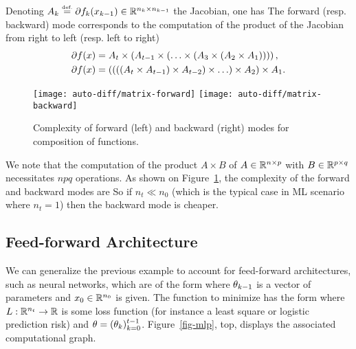 Denoting $A_k \stackrel{\mbox{\upshape\tiny def.}}{=} \partial f_k(x_{k-1}) \in \mathbb{R}^{n_{k} \times n_{k-1}}$ the Jacobian, one has
The forward (resp. backward) mode corresponds to the computation of the product of the Jacobian from right to left (resp. left to right) 
\begin{align*}
	\partial f(x) &= A_{t} \times \left(   A_{t-1} \times \left(  \ldots \times \left(  A_3 \times \left(  A_2 \times A_1  \right)  \right)  \right)  \right), \\
	\partial f(x) &= \left(  \left(  \left(  \left(  A_{t} \times A_{t-1}  \right)  \times A_{t-2}  \right) \times \ldots  \right) \times A_2  \right) \times A_1.
\end{align*}


\begin{figure}
\centering
\texttt{[image: auto-diff/matrix-forward]} 
\qquad
\texttt{[image: auto-diff/matrix-backward]} 
\caption{\label{fig-matrix-mult}
Complexity of forward (left) and backward (right) modes for composition of functions. 
}
\end{figure}

We note that the computation of the product $A \times B$ of $A \in \mathbb{R}^{n \times p}$ with $B \in \mathbb{R}^{p \times q}$ necessitates $npq$ operations.
%
As shown on Figure~\ref{fig-matrix-mult}, the complexity of the forward and backward modes are
So if $n_t \ll n_0$ (which is the typical case in ML scenario where $n_t=1$) then the backward mode is cheaper. 


\subsection{Feed-forward Architecture}

We can generalize the previous example to account for feed-forward architectures, such as neural networks, which are of the form
where $\theta_{k-1}$ is a vector of parameters and $x_0 \in \mathbb{R}^{n_0}$ is given. The function to minimize has the form
where $L : \mathbb{R}^{n_t} \rightarrow \mathbb{R}$ is some loss function (for instance a least square or logistic prediction risk) and $\theta=(\theta_k)_{k=0}^{t-1}$. Figure~\ref{fig-mlp}, top, displays the associated computational graph.


